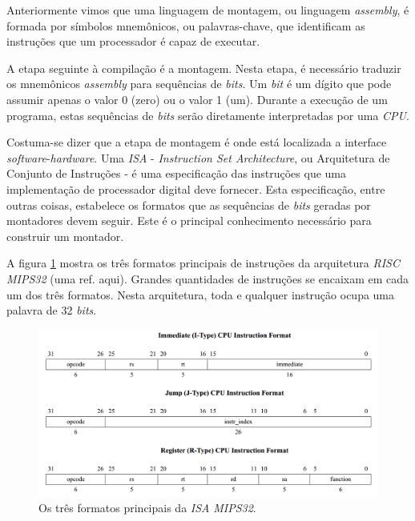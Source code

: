 Anteriormente vimos que uma linguagem de montagem, ou linguagem \textit{assembly}, é formada por símbolos mnemônicos, ou palavras-chave, que identificam as instruções que um processador é capaz de executar.

A etapa seguinte à compilação é a montagem. Nesta etapa, é necessário traduzir os mnemônicos \textit{assembly} para sequências de \textit{bits}. Um \textit{bit} é um dígito que pode assumir apenas o valor 0 (zero) ou o valor 1 (um). Durante a execução de um programa, estas sequências de \textit{bits} serão diretamente interpretadas por uma \textit{CPU}.

Costuma-se dizer que a etapa de montagem é onde está localizada a interface \textit{software}-\textit{hardware}. Uma \textit{ISA} - \textit{Instruction Set Architecture}, ou Arquitetura de Conjunto de Instruções - é uma especificação das instruções que uma implementação de processador digital deve fornecer. Esta especificação, entre outras coisas, estabelece os formatos que as sequências de \textit{bits} geradas por montadores devem seguir. Este é o principal conhecimento necessário para construir um montador.

A figura \ref{instrucoes_mips} mostra os três formatos principais de instruções da arquitetura \textit{RISC} \textit{MIPS32} (uma ref. aqui). Grandes quantidades de instruções se encaixam em cada um dos três formatos. Nesta arquitetura, toda e qualquer instrução ocupa uma palavra de 32 \textit{bits}.

\begin{figure}[ptb]
  \begin{center}
    \includegraphics[scale=.35]{imagens/instrucoes_mips}
  \end{center}
  \caption{Os três formatos principais da \textit{ISA} \textit{MIPS32}.}
  \label{instrucoes_mips}
\end{figure}

